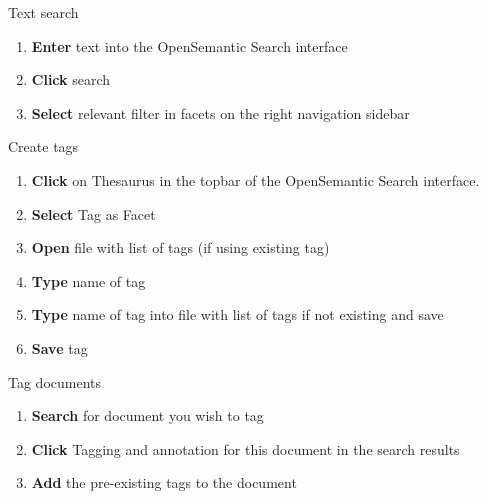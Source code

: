 \documentclass[10pt,a4paper]{article}
\begin{document}
\begin{textbox}{Text search}
 

  

\begin{enumerate}
\item \textbf{Enter} text into the OpenSemantic Search interface 
\item \textbf{Click} search
\item \textbf{Select} relevant filter in facets on the right navigation sidebar 
\end{enumerate}

\end{textbox}


\begin{textbox}{Create tags}
 

  

\begin{enumerate}
\item \textbf{Click} on Thesaurus in the topbar of the OpenSemantic Search interface.
\item \textbf{Select} Tag as Facet 
\item \textbf{Open} file with list of tags (if using existing tag)
\item \textbf{Type} name of tag
\item \textbf{Type} name of tag into file with list of tags if not existing and save
\item \textbf{Save} tag 
 
\end{enumerate}

\end{textbox}

\begin{textbox}{Tag documents}

  

\begin{enumerate}
\item \textbf{Search} for document you wish to tag
\item \textbf{Click} Tagging and annotation for this document in the search results
\item \textbf{Add} the pre-existing tags to the document 
\end{enumerate}

\end{textbox}
\end{document}
